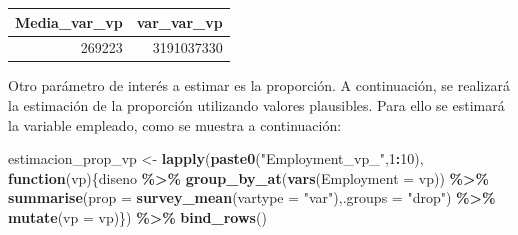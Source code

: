 \documentclass[
  spanish,
  12pt,
]{book}
\newenvironment{Shaded}{\begin{snugshade}}{\end{snugshade}}
\newcommand{\AttributeTok}[1]{\textcolor[rgb]{0.13,0.29,0.53}{#1}}
\newcommand{\ControlFlowTok}[1]{\textcolor[rgb]{0.13,0.29,0.53}{\textbf{#1}}}
\newcommand{\DecValTok}[1]{\textcolor[rgb]{0.00,0.00,0.81}{#1}}
\newcommand{\FunctionTok}[1]{\textcolor[rgb]{0.13,0.29,0.53}{\textbf{#1}}}
\newcommand{\NormalTok}[1]{#1}
\newcommand{\OtherTok}[1]{\textcolor[rgb]{0.56,0.35,0.01}{#1}}
\newcommand{\SpecialCharTok}[1]{\textcolor[rgb]{0.81,0.36,0.00}{\textbf{#1}}}
\newcommand{\StringTok}[1]{\textcolor[rgb]{0.31,0.60,0.02}{#1}}
\begin{document}
\begin{Shaded}
\end{Shaded}

\begin{tabular}{r|r}
\hline
Media\_var\_vp & var\_var\_vp\\
\hline
269223 & 3191037330\\
\hline
\end{tabular}

Otro parámetro de interés a estimar es la proporción. A continuación, se realizará la estimación de la proporción utilizando valores plausibles. Para ello se estimará la variable empleado, como se muestra a continuación:

\begin{Shaded}
\begin{Highlighting}[]
\NormalTok{estimacion\_prop\_vp }\OtherTok{\textless{}{-}} \FunctionTok{lapply}\NormalTok{(}\FunctionTok{paste0}\NormalTok{(}\StringTok{"Employment\_vp\_"}\NormalTok{,}\DecValTok{1}\SpecialCharTok{:}\DecValTok{10}\NormalTok{),}
       \ControlFlowTok{function}\NormalTok{(vp)\{diseno }\SpecialCharTok{\%\textgreater{}\%} \FunctionTok{group\_by\_at}\NormalTok{(}\FunctionTok{vars}\NormalTok{(}\AttributeTok{Employment =}\NormalTok{ vp)) }\SpecialCharTok{\%\textgreater{}\%} 
  \FunctionTok{summarise}\NormalTok{(}\AttributeTok{prop =} \FunctionTok{survey\_mean}\NormalTok{(}\AttributeTok{vartype =} \StringTok{"var"}\NormalTok{),}\AttributeTok{.groups =} \StringTok{"drop"}\NormalTok{) }\SpecialCharTok{\%\textgreater{}\%}
         \FunctionTok{mutate}\NormalTok{(}\AttributeTok{vp =}\NormalTok{ vp)\}) }\SpecialCharTok{\%\textgreater{}\%} \FunctionTok{bind\_rows}\NormalTok{()}
\end{Highlighting}
\end{Shaded}
\end{document}
